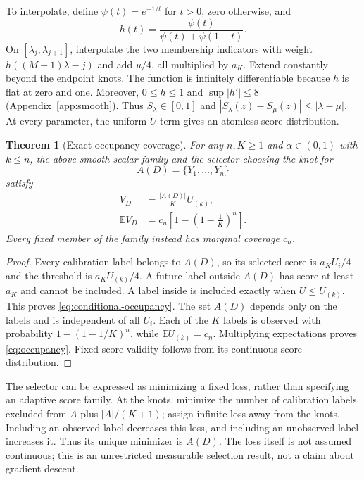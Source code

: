 \documentclass{article}
\newtheorem{theorem}{Theorem}
\newcommand{\EE}{\mathbb E}
\begin{document}
To interpolate, define $\psi(t)=e^{-1/t}$ for $t>0$, zero otherwise, and
\begin{equation}\label{eq:smooth}
 h(t)=\frac{\psi(t)}{\psi(t)+\psi(1-t)}.
\end{equation}
On $[\lambda_j,\lambda_{j+1}]$, interpolate the two membership indicators with weight $h((M-1)\lambda-j)$ and add $u/4$, all multiplied by $a_K$. Extend constantly beyond the endpoint knots. The function is infinitely differentiable because $h$ is flat at zero and one. Moreover, $0\le h\le1$ and $\sup|h'|\le8$ (Appendix~\ref{app:smooth}). Thus $S_\lambda\in[0,1]$ and $|S_\lambda(z)-S_\mu(z)|\le|\lambda-\mu|$. At every parameter, the uniform $U$ term gives an atomless score distribution.

\begin{theorem}[Exact occupancy coverage]\label{thm:occupancy}
For any $n,K\ge1$ and $\alpha\in(0,1)$ with $k\le n$, the above smooth scalar family and the selector choosing the knot for
\begin{equation}
 A(D)=\{Y_1,\ldots,Y_n\}
\end{equation}
satisfy
\begin{align}
 V_D&=\frac{|A(D)|}{K}U_{(k)},\label{eq:conditional-occupancy}\\
 \EE V_D&=c_n\left[1-\left(1-\frac1K\right)^n\right].\label{eq:occupancy}
\end{align}
Every fixed member of the family instead has marginal coverage $c_n$.
\end{theorem}

\begin{proof}
Every calibration label belongs to $A(D)$, so its selected score is $a_KU_i/4$ and the threshold is $a_KU_{(k)}/4$. A future label outside $A(D)$ has score at least $a_K$ and cannot be included. A label inside is included exactly when $U\le U_{(k)}$. This proves \cref{eq:conditional-occupancy}. The set $A(D)$ depends only on the labels and is independent of all $U_i$. Each of the $K$ labels is observed with probability $1-(1-1/K)^n$, while $\EE U_{(k)}=c_n$. Multiplying expectations proves \cref{eq:occupancy}. Fixed-score validity follows from its continuous score distribution.
\end{proof}

The selector can be expressed as minimizing a fixed loss, rather than specifying an adaptive score family. At the knots, minimize the number of calibration labels excluded from $A$ plus $|A|/(K+1)$; assign infinite loss away from the knots. Including an observed label decreases this loss, and including an unobserved label increases it. Thus its unique minimizer is $A(D)$. The loss itself is not assumed continuous; this is an unrestricted measurable selection result, not a claim about gradient descent.
\end{document}

